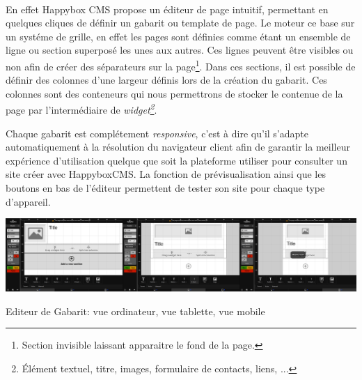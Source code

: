 \documentclass[11pt, a4paper ]{article}
\begin{document}
\begin{spacing}{1.5}
\paragraph{}
En effet Happybox CMS propose un éditeur de page intuitif, permettant en quelques cliques de définir un gabarit ou template de page. Le moteur ce base sur un systéme de grille, en effet les pages sont définies comme étant un ensemble de ligne ou section superposé les unes aux autres. Ces lignes peuvent être visibles ou non afin de créer des séparateurs sur la page\footnote{Section invisible laissant apparaitre le fond de la page.}. Dans ces sections, il est possible de définir des colonnes d'une largeur définis lors de la création du gabarit. Ces colonnes sont des conteneurs qui nous permettrons de stocker le contenue de la page par l'intermédiaire de \emph{widget\footnote{Élément textuel, titre, images, formulaire de contacts, liens, ...}}.

Chaque gabarit est complétement \emph{responsive}, c'est à dire qu'il s'adapte automatiquement à la résolution du navigateur client afin de garantir la meilleur expérience d'utilisation quelque que soit la plateforme utiliser pour consulter un site créer avec HappyboxCMS. La fonction de prévisualisation ainsi que les boutons en bas de l'éditeur permettent de tester son site pour chaque type d'appareil.


\begin{center}

		\includegraphics[width=\textwidth]{images/HBscreen/editeurGabarit.png}
		\caption{Editeur de Gabarit: vue ordinateur, vue tablette, vue mobile}

\end{center}


\end{spacing}
\end{document}
